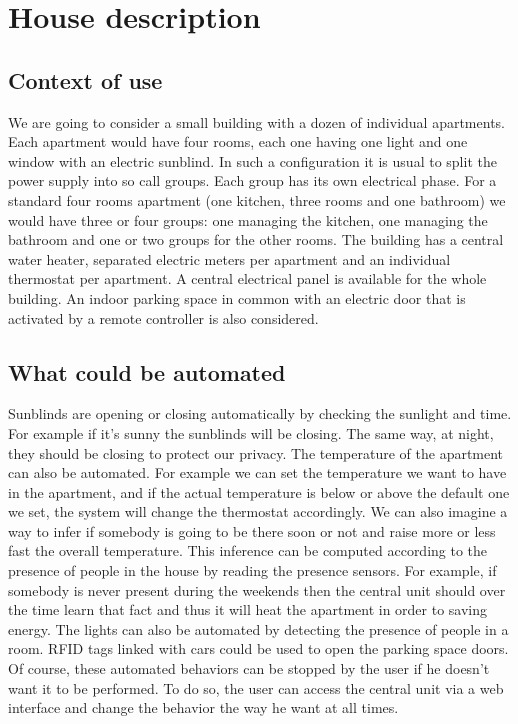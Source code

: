\documentclass{acm_proc_article-sp}
\begin{document}
\section{House description}
\subsection{Context of use}
We are going to consider a small building with a dozen of individual apartments. 
Each apartment would have four rooms, each one having one light and one window with an electric sunblind. 
In such a configuration it is usual to split the power supply into so call groups. 
Each group has its own electrical phase. 
For a standard four rooms apartment (one kitchen, three rooms and one bathroom) we would have three or four groups: one managing the kitchen, one managing the bathroom and one or two groups for the other rooms. 
The building has a central water heater, separated electric meters per apartment and an individual thermostat per apartment. 
A central electrical panel is available for the whole building. An indoor parking space in common with an electric door that is activated by a remote controller is also considered.
\subsection{What could be automated}
Sunblinds are opening or closing automatically by checking the sunlight and time. 
For example if it's sunny the sunblinds will be closing. The same way, at night, they should be closing to protect our privacy.
The temperature of the apartment can also be automated. For example we can set the temperature we want to have in the apartment, 
and if the actual temperature is below or above the default one we set, the system will change the thermostat accordingly. 
We can also imagine a way to infer if somebody is going to be there soon or not and raise more or less fast the overall temperature. 
This inference can be computed according to the presence of people in the house by reading the presence sensors. 
For example, if somebody is never present during the weekends then the central unit should over the time learn that fact and thus it will heat the apartment in order to saving energy.
The lights can also be automated by detecting the presence of people in a room.
RFID tags linked with cars could be used to open the parking space doors.
Of course, these automated behaviors can be stopped by the user if he doesn't want it to be performed. 
To do so, the user can access the central unit via a web interface and change the behavior the way he want at all times.
\end{document}
